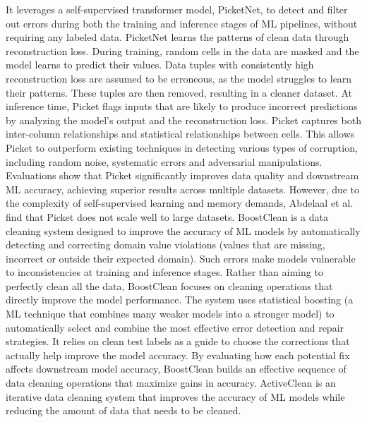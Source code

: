 It leverages a self-supervised transformer model, PicketNet, to detect and filter out errors during both the training and inference stages of ML pipelines, without requiring any labeled data. 
PicketNet learns the patterns of clean data through reconstruction loss. 
During training, random cells in the data are masked and the model learns to predict their values. 
Data tuples with consistently high reconstruction loss are assumed to be erroneous, as the model struggles to learn their patterns. 
These tuples are then removed, resulting in a cleaner dataset. 
At inference time, Picket flags inputs that are likely to produce incorrect predictions by analyzing the model's output and the reconstruction loss. 
Picket captures both inter-column relationships and statistical relationships between cells. 
This allows Picket to outperform existing techniques in detecting various types of corruption, including random noise, systematic errors and adversarial manipulations.
Evaluations show that Picket significantly improves data quality and downstream ML accuracy, achieving superior results across multiple datasets. 
However, due to the complexity of self-supervised learning and memory demands, Abdelaal et al. \cite{REIN} find that Picket does not scale well to large datasets.
\newline\newline
BoostClean \cite{BOOSTCLEAN} is a data cleaning system designed to improve the accuracy of ML models by automatically detecting and correcting domain value violations (values that are missing, incorrect or outside their expected domain). 
Such errors make models vulnerable to inconsistencies at training and inference stages. 
Rather than aiming to perfectly clean all the data, BoostClean focuses on cleaning operations that directly improve the model performance. 
The system uses statistical boosting (a ML technique that combines many weaker models into a stronger model) to automatically select and combine the most effective error detection and repair strategies. 
It relies on clean test labels as a guide to choose the corrections that actually help improve the model accuracy. 
By evaluating how each potential fix affects downstream model accuracy, BoostClean builds an effective sequence of data cleaning operations that maximize gains in accuracy.
\newline\newline
ActiveClean \cite{ACTIVECLEAN} is an iterative data cleaning system that improves the accuracy of ML models while reducing the amount of data that needs to be cleaned. 
